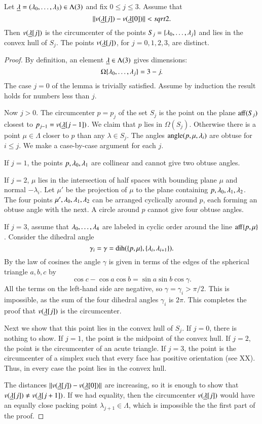 \begin{lemma}\label{lemma:v2} Let ${\underline{\lambda}}=(\lambda_0,\ldots,\lambda_3)\in\Lambda(3)$ and fix $0\le j\le 3$.  Assume that
$$
{\|v({\underline{\lambda}}[j]) - v({\underline{\lambda}}[0])\|} < sqrt2.
$$
Then $v({\underline{\lambda}}[j])$ is the circumcenter of the points $S_j =\{\lambda_0,\ldots,\lambda_j\}$ and
lies in the convex hull of $S_j$.  The points $v({\underline{\lambda}}[j])$, for $j=0,1,2,3$, are distinct.
\end{lemma}

\begin{proof} By definition, an element ${\underline{\lambda}}\in\Lambda(3)$ gives dimensions: 
$$\Omega\{\lambda_0,\ldots,\lambda_j\} = 3-j.$$  The case $j=0$ of the lemma is trivially
satisfied.  Assume by induction the result holds for numbers less than $j$.

Now $j>0$.
The circumcenter $p=p_{j}$ of the set $S_{j}$ is the point on the plane ${\operatorname{aff}}(S_{j})$
closest to $p_{j-1}=v({\underline{\lambda}}[j-1])$.  We claim that $p$ lies in $\Omega(S_{j})$.  Otherwise
there is a point $\mu\in\Lambda$ closer to $p$ than any $\lambda\in S_{j}$.  
The angles ${{\operatorname{angle}}(p,{\mu,\lambda_i})}$ are obtuse for $i\le j$.  We make a case-by-case
argument for each $j$.

If $j=1$, the points $p,\lambda_0,\lambda_1$ are collinear and cannot give two obtuse angles.

If $j=2$, $\mu$ lies in the intersection of half spaces with bounding plane $\mu$
and normal $-\lambda_i$.  Let $\mu'$ be the projection of $\mu$ to the plane containing
$p,\lambda_0,\lambda_1,\lambda_2$. The four points $\mu',\lambda_0,\lambda_1,\lambda_2$ can be arranged
cyclically around $p$, each forming an obtuse angle with the next.  A circle around $p$
cannot give four obtuse angles.


If $j=3$, assume that $\lambda_0,\ldots,\lambda_4$ are labeled in cyclic order around the line
${\operatorname{aff}}\{p,\mu\}$.  Consider the dihedral angle 
  $$
  \gamma_i=\gamma=\operatorname{dih}(\{p,\mu\},\{\lambda_i,\lambda_{i+1}\}).
  $$
By the law of cosines the angle $\gamma$ is given in terms of the edges of the spherical
triangle $a,b,c$ by
$$
  \cos c - \cos a \cos b = \sin a \sin b \cos \gamma.
$$
All the terms on the left-hand side are negative, so $\gamma =\gamma_i > \pi/2$.
This is impossible, as the sum of the four dihedral angles $\gamma_i$ is $2\pi$.
This completes the proof that $v({\underline{\lambda}}[j])$ is the circumcenter.

Next we show that this point lies in the convex hull of $S_j$.
If $j=0$, there is nothing to show.  If $j=1$, the point is the midpoint of the convex hull.
If $j=2$, the point is the circumcenter of an acute triangle.  If $j=3$, the point is the
circumcenter of a simplex such that every face has positive orientation (see XX).  Thus,
in every case the point lies in the convex hull.

The distances ${\|v({\underline{\lambda}}[j])-v({\underline{\lambda}}[0])\|}$ are increasing, so it is enough to show
that $v({\underline{\lambda}}[j])\ne v({\underline{\lambda}}[j+1])$.  If we had equality, then the circumcenter $v({\underline{\lambda}}[j])$
would have an equally close packing point $\lambda_{j+1}\in\Lambda$, which is impossible
the the first part of the proof.
\end{proof}

